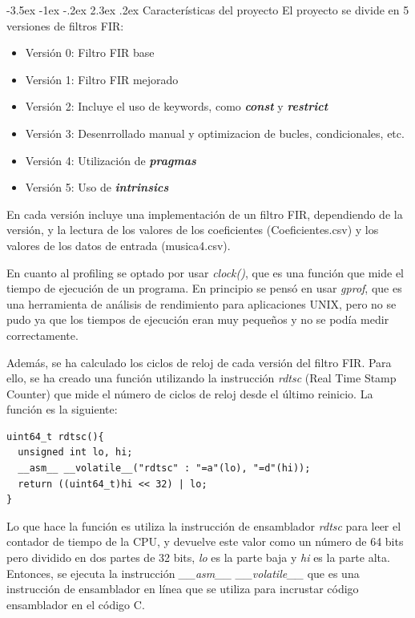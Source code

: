 \documentclass[11pt]{report}
\makeatletter
\renewcommand\chapter{\@startsection{chapter}{0}{\z@}%
    {-3.5ex \@plus -1ex \@minus -.2ex}%
    {2.3ex \@plus.2ex}%
    {\normalfont\Large\bfseries}}
\makeatother
\begin{document}
\chapter{Características del proyecto}
El proyecto se divide en 5 versiones de filtros FIR:
\begin{itemize}
  \item Versión 0: Filtro FIR base
  \item Versión 1: Filtro FIR mejorado
  \item Versión 2: Incluye el uso de keywords, como \emph{\textbf{const}} y \emph{\textbf{restrict}}
  \item Versión 3: Desenrrollado manual y optimizacion de bucles, condicionales, etc.
  \item Versión 4: Utilización de \emph{\textbf{pragmas}}
  \item Versión 5: Uso de \emph{\textbf{intrinsics}}
\end{itemize}

En cada versión incluye una implementación de un filtro FIR, dependiendo de la versión, y la lectura de los valores
de los coeficientes (Coeficientes.csv) y los valores de los datos de entrada (musica4.csv).

En cuanto al profiling se optado por usar \emph{clock()}, que es una función que mide el tiempo de ejecución de un programa. En principio
se pensó en usar \emph{gprof}, que es una herramienta de análisis de rendimiento para aplicaciones UNIX, pero no se pudo ya que los tiempos
de ejecución eran muy pequeños y no se podía medir correctamente.

Además, se ha calculado los ciclos de reloj de cada versión del filtro FIR. Para ello, se ha creado una función utilizando la instrucción
\emph{rdtsc} (Real Time Stamp Counter) que mide el número de ciclos de reloj desde el último reinicio. La función es la siguiente:
\begin{lstlisting}
uint64_t rdtsc(){
  unsigned int lo, hi;
  __asm__ __volatile__("rdtsc" : "=a"(lo), "=d"(hi));
  return ((uint64_t)hi << 32) | lo;
}
\end{lstlisting}

Lo que hace la función es utiliza la instrucción de ensamblador \emph{rdtsc} para leer el contador de tiempo de la CPU, y devuelve este 
valor como un número de 64 bits pero dividido en dos partes de 32 bits, \emph{lo} es la parte baja y \emph{hi} es la parte alta. Entonces,
se ejecuta la instrucción \emph{\_\_asm\_\_ \_\_volatile\_\_} que es una instrucción de ensamblador en línea que se utiliza para incrustar código
ensamblador en el código C.
\end{document}
